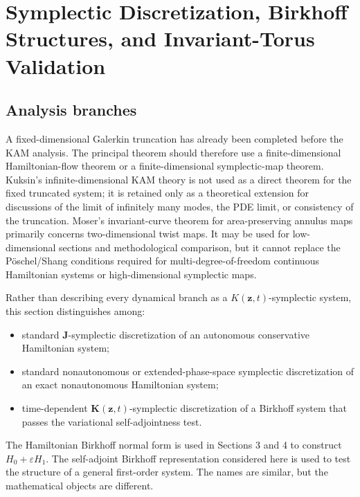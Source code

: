 \section{Symplectic Discretization, Birkhoff Structures, and Invariant-Torus Validation}\label{sec:symplectic-kam}

\subsection{Analysis branches}\label{sec:symplectic-kam-5-1}

A fixed-dimensional Galerkin truncation has already been completed before the KAM analysis. The principal theorem should therefore use a finite-dimensional Hamiltonian-flow theorem or a finite-dimensional symplectic-map theorem. Kuksin's infinite-dimensional KAM theory\cite{Kuksin1993InfiniteDimensionalKAM} is not used as a direct theorem for the fixed truncated system; it is retained only as a theoretical extension for discussions of the limit of infinitely many modes, the PDE limit, or consistency of the truncation. Moser's invariant-curve theorem for area-preserving annulus maps\cite{Moser1962InvariantCurves} primarily concerns two-dimensional twist maps. It may be used for low-dimensional sections and methodological comparison, but it cannot replace the Pöschel/Shang conditions required for multi-degree-of-freedom continuous Hamiltonian systems or high-dimensional symplectic maps.\cite{Shang1999KAMAlgorithms,Shang2000KAMMappings,Poschel2001KAMLecture}

Rather than describing every dynamical branch as a \(K\left( \mathbf{z},t \right)\)-symplectic system, this section distinguishes among:

\begin{itemize}
\tightlist
\item
  standard \(\mathbf{J}\)-symplectic discretization of an autonomous conservative Hamiltonian system;
\item
  standard nonautonomous or extended-phase-space symplectic discretization of an exact nonautonomous Hamiltonian system;
\item
  time-dependent \(\mathbf{K}\left( \mathbf{z},t \right)\)-symplectic discretization of a Birkhoff system that passes the variational self-adjointness test.
\end{itemize}

The Hamiltonian Birkhoff normal form is used in Sections 3 and 4 to construct \(H_{0} + \varepsilon H_{1}\). The self-adjoint Birkhoff representation considered here is used to test the structure of a general first-order system. The names are similar, but the mathematical objects are different.

